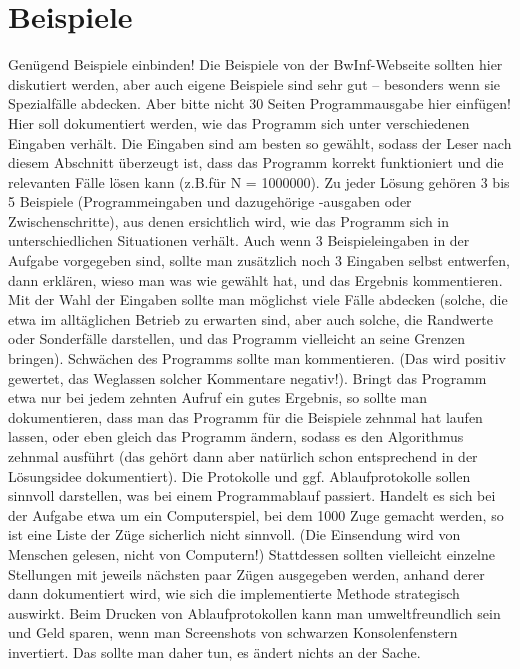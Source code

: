 \documentclass[a4paper,10pt,ngerman]{scrartcl}
\begin{document}
	\section{Beispiele}\label{sec:beispiele}
	Genügend Beispiele einbinden!
	Die Beispiele von der BwInf-Webseite sollten hier diskutiert werden, aber auch eigene Beispiele sind sehr gut – besonders wenn sie Spezialfälle abdecken.
	Aber bitte nicht 30 Seiten Programmausgabe hier einfügen!
	Hier soll dokumentiert werden, wie das Programm sich unter verschiedenen Eingaben verhält.
	Die Eingaben sind am besten so gewählt, sodass der Leser nach diesem Abschnitt überzeugt ist, dass das Programm korrekt funktioniert und die relevanten Fälle lösen kann (z.B.für N = 1000000).
	Zu jeder Lösung gehören 3 bis 5 Beispiele (Programmeingaben und dazugehörige -ausgaben oder Zwischenschritte), aus denen ersichtlich wird, wie das Programm sich in unterschiedlichen Situationen verhält.
	Auch wenn 3 Beispieleingaben in der Aufgabe vorgegeben sind, sollte man zusätzlich noch 3 Eingaben selbst entwerfen, dann erklären, wieso man was wie gewählt hat, und das Ergebnis kommentieren.
	Mit der Wahl der Eingaben sollte man möglichst viele Fälle abdecken (solche, die etwa im alltäglichen Betrieb zu erwarten sind, aber auch solche, die Randwerte oder Sonderfälle darstellen, und das Programm vielleicht an seine Grenzen bringen).
	Schwächen des Programms sollte man kommentieren.
	(Das wird positiv gewertet, das Weglassen solcher Kommentare negativ!).
	Bringt das Programm etwa nur bei jedem zehnten Aufruf ein gutes Ergebnis, so sollte man dokumentieren, dass man das Programm für die Beispiele zehnmal hat laufen lassen, oder eben gleich das Programm ändern, sodass es den Algorithmus zehnmal ausführt (das gehört dann aber natürlich schon entsprechend in der Lösungsidee dokumentiert).
	Die Protokolle und ggf. Ablaufprotokolle sollen sinnvoll darstellen, was bei einem Programmablauf passiert.
	Handelt es sich bei der Aufgabe etwa um ein Computerspiel, bei dem 1000 Zuge gemacht werden, so ist eine Liste der Züge sicherlich nicht sinnvoll.
	(Die Einsendung wird von Menschen gelesen, nicht von Computern!)
	Stattdessen sollten vielleicht einzelne Stellungen mit jeweils nächsten paar Zügen ausgegeben werden, anhand derer dann dokumentiert wird, wie sich die implementierte Methode strategisch auswirkt.
	Beim Drucken von Ablaufprotokollen kann man umweltfreundlich sein und Geld sparen, wenn man Screenshots von schwarzen Konsolenfenstern invertiert.
	Das sollte man daher tun, es ändert nichts an der Sache.
\end{document}
